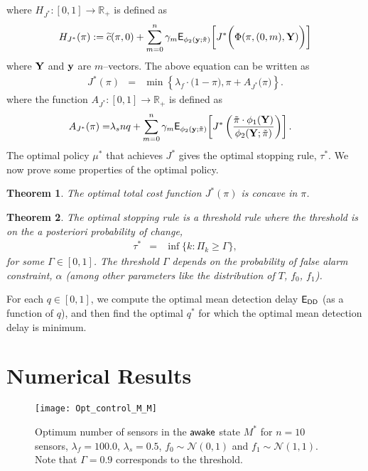 \documentclass[journal]{IEEEtran}
\newcommand{\PRemPHI}{\phi_2({\bf y} ;\tilde{\pi})}
\newtheorem{theorem}{Theorem}
\newcommand{\wake}{{${\sf awake }$}}
\newcommand{\EXPm}[1]{\mathsf{E}_{\PRemPHI}\!\left[#1\right]}
\begin{document}
where
$H_{J^*}:[0,1]\to{\mathbb R}_+$ is defined as 
{\footnotesize
\begin{eqnarray*}
H_{J^*}(\pi) := \widetilde c(\pi,0) + \sum_{m=0}^n\gamma_m\EXPm{J^*\bigg(\Phi(\pi,(0,m),{\bf
Y})\bigg)}
\end{eqnarray*}
}
where ${\bf Y}$ and ${\bf y}$ are $m$--vectors.
The above equation can be written as 
\begin{eqnarray} 
\label{eqn:DP_for_control_q}
J^*(\pi)  
        & = & \min\left\{\lambda_f\cdot\big(1-\pi\big),  \pi + A_{J^*}\big({\pi}\big)\right\}.
\end{eqnarray}
where the function $A_{J^*}:[0,1]\to\mathbb{R}_+$ is defined as
\begin{align*} 
A_{J^*}({\pi}) 
= & \lambda_snq + \sum_{m=0}^n \gamma_m \EXPm{J^*\left(\frac{\tilde{\pi}\cdot\phi_1({\bf Y})}{\phi_2({\bf Y};\tilde{\pi})}\right)}. 
\end{align*}
The optimal policy $\mu^*$  that achieves $J^*$ gives the optimal
stopping rule, $\tau^*$. 
We now prove some properties of the optimal policy. 
\begin{theorem}
\label{thm:label5}
The optimal total cost function $J^*(\pi)$ is concave in $\pi$. 
\end{theorem}


\begin{theorem}
\label{thm:label6}
The optimal stopping rule is a threshold rule where the threshold is on
the a posteriori probability of change,
\begin{eqnarray*}
\tau^* & = & \inf\{k : \Pi_k \geqslant \Gamma\},
\end{eqnarray*}
for some $\Gamma \in [0, 1]$. The threshold $\Gamma$ depends on the
probability of false alarm constraint, $\alpha$ (among other parameters
like the distribution of $T$, $f_0$, $f_1$). 
\end{theorem}

For each $q \in [0,1]$, we compute the optimal mean detection delay
${\sf E_{DD}}$ (as a function of $q$), and then find the optimal $q^*$
for which the optimal mean detection delay is minimum.

\section{Numerical Results} 
\label{sec:numerical_results} 
\begin{figure}
\centering
\texttt{[image: Opt\_control\_M\_M]}
\caption{Optimum number of sensors in the {\wake} state $M^*$ for $n = 10$ sensors, 
$\lambda_f = 100.0$, $\lambda_s = 0.5$, $f_0 \sim \mathcal{N}(0,1)$ and $f_1 \sim \mathcal{N}(1,1)$. Note that $\Gamma = 0.9$ corresponds to the threshold.}
\label{fig:Opt_control_M_M}
\end{figure}
\end{document}
